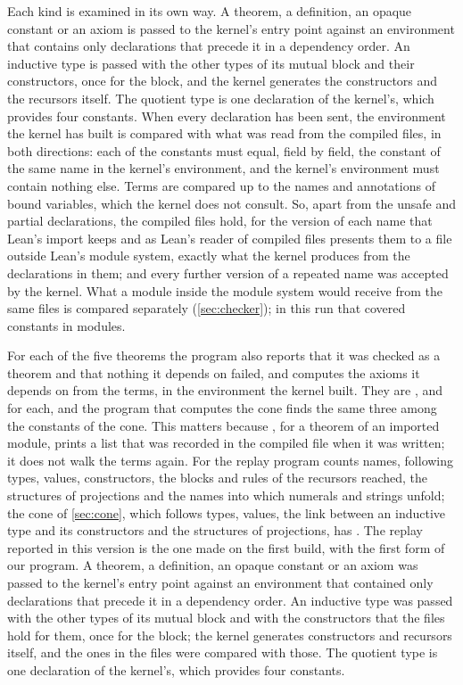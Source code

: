 \ifsecondrun
Each kind is examined in its own way. A theorem, a definition, an opaque constant or an axiom
is passed to the kernel's entry point  against an
environment that contains only declarations that precede it in a dependency order. An
inductive type is passed with the other types of its mutual block and their constructors,
once for the block, and the kernel generates the constructors and the recursors itself. The
quotient type is one declaration of the kernel's, which provides four constants. When every
declaration has been sent, the environment the kernel has built is compared with what was
read from the compiled files, in both directions: each of the \replaydecls{} constants must
equal, field by field, the constant of the same name in the kernel's environment, and the
kernel's environment must contain nothing else. Terms are compared up to the names and
annotations of bound variables, which the kernel does not consult. So, apart from the unsafe
and partial declarations, the compiled files hold, for the version of each name that Lean's
import keeps and as Lean's reader of compiled files presents them to a file outside Lean's
module system, exactly what the kernel produces from the declarations in them; and every
further version of a repeated name was accepted by the kernel. What a module inside the
module system would receive from the same files is compared separately (\cref{sec:checker});
in this run that covered \replayexported{} constants in \replayexportedmodules{} modules.

\replaystatus

For each of the five theorems the program also reports that it was checked as a theorem and
that nothing it depends on failed, and computes the axioms it depends on from the terms, in
the environment the kernel built. They are ,  and
 for each, and the program that computes the cone finds the same three among
the constants of the cone. This matters because , for a theorem of an
imported module, prints a list that was recorded in the compiled file when it was written; it
does not walk the terms again. For  the replay program counts
\replayconeconstants{} names, following types, values, constructors, the blocks and rules of
the recursors reached, the structures of projections and the names into which numerals and
strings unfold; the cone of \cref{sec:cone}, which follows types, values, the link between an
inductive type and its constructors and the structures of projections, has \conesize{}.
\else
The replay reported in this version is the one made on the first build, with the first form
of our program. A theorem, a definition, an opaque constant or an axiom was passed to the
kernel's entry point  against an environment that
contained only declarations that precede it in a dependency order. An inductive type was
passed with the other types of its mutual block and with the constructors that the files hold
for them, once for the block; the kernel generates constructors and recursors itself, and the
ones in the files were compared with those. The quotient type is one declaration of the
kernel's, which provides four constants.

